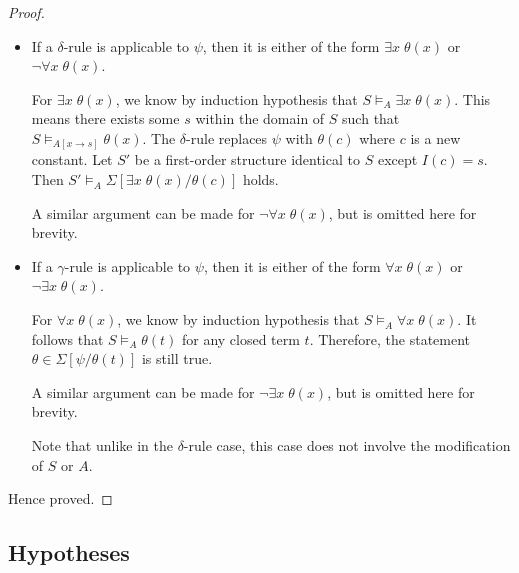 \begin{proof}
\begin{itemize}
\begin{itemize}
            \item If a \(\delta\)-rule is applicable to \(\psi\), then it is either of the form \(\exists x\; \theta(x)\) or \(\neg\forall x\; \theta(x)\).
            
            For \(\exists x\; \theta(x)\), we know by induction hypothesis that \(S \models_A \exists x\; \theta(x)\). This means there exists some \(s\) within the domain of \(S\) such that \(S \models_{A[x \rightarrow s]} \theta(x)\). The \(\delta\)-rule replaces \(\psi\) with \(\theta(c)\) where \(c\) is a new constant. Let \(S'\) be a first-order structure identical to \(S\) except \(I(c) = s\). Then \(S' \models_A \Sigma[\exists x\; \theta(x) / \theta(c)]\) holds.

            A similar argument can be made for \(\neg\forall x\; \theta(x)\), but is omitted here for brevity.

            \item If a \(\gamma\)-rule is applicable to \(\psi\), then it is either of the form \(\forall x\; \theta(x)\) or \(\neg\exists x\; \theta(x)\).
            
            For \(\forall x\; \theta(x)\), we know by induction hypothesis that \(S \models_A \forall x\; \theta(x)\). It follows that \(S \models_A \theta(t)\) for any closed term \(t\). Therefore, the statement \(\theta \in \Sigma[\psi/\theta(t)]\) is still true.

            A similar argument can be made for \(\neg\exists x\; \theta(x)\), but is omitted here for brevity.

            Note that unlike in the \(\delta\)-rule case, this case does not involve the modification of \(S\) or \(A\).
        \end{itemize}
    \end{itemize}
    Hence proved.
\end{proof}




\subsection{Hypotheses}

